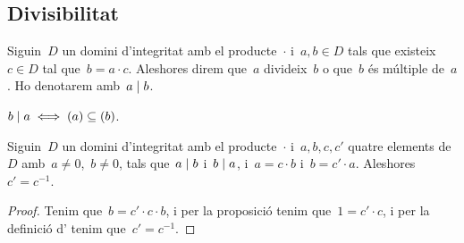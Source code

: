 \documentclass[../../main.tex]{subfiles}
\begin{document}
    \subsection{Divisibilitat}
    \begin{definition}
        \label{def:divisor per anells}
        \label{def:múltiple per anells}
        Siguin~\(D\) un domini d'integritat amb el producte~\(\cdot\) i~\(a,b\in D\) tals que existeix~\(c\in D\) tal que~\(b=a\cdot c\).
        Aleshores direm que~\(a\) divideix~\(b\) o que~\(b\) és múltiple de~\(a\).
        Ho denotarem amb~\(a\mathrel{|} b\).
    \end{definition}
    \begin{observation}
        \label{obs:divisors són ideals continguts}
        \(b\mathrel{|} a\iff(a)\subseteq(b)\).
    \end{observation}
    \begin{proposition}
        \label{prop:podem passar els múltiples de costat a costat}
        Siguin~\(D\) un domini d'integritat amb el producte~\(\cdot\) i~\(a,b,c,c'\) quatre elements de~\(D\) amb~\(a\neq0\),~\(b\neq0\), tals que~\(a\mathrel{|} b\) i~\(b\mathrel{|} a\), i~\(a=c\cdot b\) i~\(b=c'\cdot a\).
        Aleshores~\(c'=c^{-1}\).
        \begin{proof}
            Tenim que~\(b=c'\cdot c\cdot b\), i per la proposició  tenim que~\(1=c'\cdot c\), i per la definició d' tenim que~\(c'=c^{-1}\).
        \end{proof}
    \end{proposition}
\end{document}
